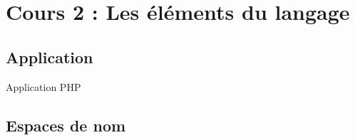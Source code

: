 
\section{Cours \textnumero{}2 : Les éléments du langage}



\subsection{Application}

\begin{frame}{Application PHP}

\end{frame}

\subsection{Espaces de nom}

